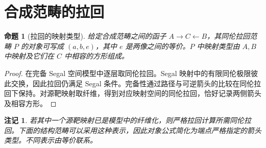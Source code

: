 \documentclass[12pt,oneside,openany,fontset=none]{ctexbook}
\theoremstyle{cn}
\newtheorem{proposition}[definition]{命题}
\newtheorem{remark}[definition]{注记}
\numberwithin{equation}{chapter}
\begin{document}
\section{合成范畴的拉回}
\begin{proposition}[拉回的映射类型]
给定合成范畴之间的函子 $A\to C\leftarrow B$，其同伦拉回范畴 $P$ 的对象可写成 $(a,b,e)$，其中 $e$ 是两像之间的等价。$P$ 中映射类型由 $A,B$ 中映射及它们在 $C$ 中相容的方形组成。
\end{proposition}
\begin{proof}
在完备 Segal 空间模型中逐层取同伦拉回。Segal 映射中的有限同伦极限彼此交换，因此拉回仍满足 Segal 条件。完备性通过路径与可逆箭头的比较在同伦拉回下保持。对源靶映射取纤维，得到对应映射空间的同伦拉回，恰好记录两侧箭头及相容方形。
\end{proof}
\begin{remark}
若其中一个源靶映射已是模型中的纤维化，则严格拉回计算所需同伦拉回。下面的结构范畴可以采用这种表示，因此对象公式简化为端点严格指定的箭头类型。不同表示由等价联系。
\end{remark}
\end{document}
